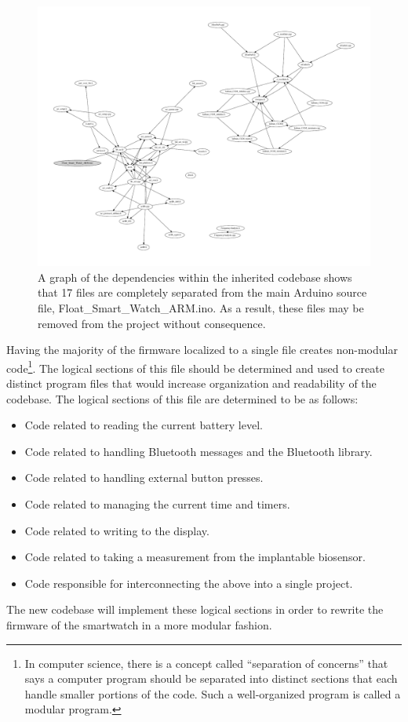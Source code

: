 \begin{figure}[htbp]
    \caption[Organization of Inherited Codebase]{
    A graph of the dependencies within the inherited codebase shows that 17 files are completely separated from the main Arduino source file, Float\_Smart\_Watch\_ARM.ino. As a result, these files may be removed from the project without consequence.
    }
    \begin{center}
    \includegraphics[width=\textwidth,keepaspectratio]{figs/inherited_organization.pdf}
    \end{center}
\label{fig:inherited_organization}
\end{figure}

Having the majority of the firmware localized to a single file creates non-modular code\footnote{In computer science, there is a concept called ``separation of concerns'' that says a computer program should be separated into distinct sections that each handle smaller portions of the code. Such a well-organized program is called a modular program\cite{wikiSoC}.}. The logical sections of this file should be determined and used to create distinct program files that would increase organization and readability of the codebase. The logical sections of this file are determined to be as follows:

\singlespacing
\begin{itemize}
  \item{} Code related to reading the current battery level.
  \item{} Code related to handling Bluetooth messages and the Bluetooth library.
  \item{} Code related to handling external button presses.
  \item{} Code related to managing the current time and timers.
  \item{} Code related to writing to the display.
  \item{} Code related to taking a measurement from the implantable biosensor.
  \item{} Code responsible for interconnecting the above into a single project.
\end{itemize}
\doublespacing
The new codebase will implement these logical sections in order to rewrite the firmware of the smartwatch in a more modular fashion.

